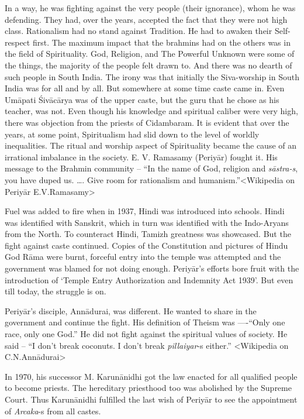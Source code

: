 In a way, he was fighting against the very people (their ignorance), whom he was defending. They had, over the years, accepted the fact that they were not high class. Rationalism had no stand against Tradition. He had to awaken their Self-respect first. The maximum impact that the brahmins had on the others was in the field of Spirituality. God, Religion, and The Powerful Unknown were some of the things, the majority of the people felt drawn to. And there was no dearth of such people in South India. The irony was that initially the Siva-worship in South India was for all and by all. But somewhere at some time caste came in. Even Umāpati Śivācārya was of the upper caste, but the guru that he chose as his teacher, was not. Even though his knowledge and spiritual caliber were very high, there was objection from the priests of Cidambaram. It is evident that over the years, at some point, Spiritualism had slid down to the level of worldly inequalities. The ritual and worship aspect of Spirituality became the cause of an irrational imbalance in the society. E. V. Ramasamy (Periyār) fought it. His message to the Brahmin community – “In the name of God, religion and \textit{sāstra-s}, you have duped us. …. Give room for rationalism and humanism.”\textless Wikipedia on Periyār E.V.Ramasamy\textgreater 

Fuel was added to fire when in 1937, Hindi was introduced into schools. Hindi was identified with Sanskrit, which in turn was identified with the Indo-Aryans from the North. To counteract Hindi, Tamizh greatness was showcased. But the fight against caste continued. Copies of the Constitution and pictures of Hindu God Rāma were burnt, forceful entry into the temple was attempted and the government was blamed for not doing enough. Periyār’s efforts bore fruit with the introduction of ‘Temple Entry Authorization and Indemnity Act 1939’. But even till today, the struggle is on.

Periyār’s disciple, Annādurai, was different. He wanted to share in the government and continue the fight. His definition of Theism was ----“Only one race, only one God.” He did not fight against the spiritual values of society. He said – “I don’t break coconuts. I don’t break \textit{pillaiyar}-s either.” \textless Wikipedia on C.N.Annādurai\textgreater 

In 1970, his successor M. Karunānidhi got the law enacted for all qualified people to become priests. The hereditary priesthood too was abolished by the Supreme Court. Thus Karunānidhi fulfilled the last wish of Periyār to see the appointment of \textit{Arcaka}-s from all castes.

